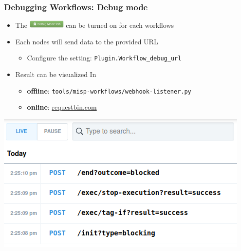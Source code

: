 \begin{frame}
    \frametitle{Debugging Workflows: Debug mode}
    \begin{itemize}
        \item The \includegraphics[width=70px]{pictures/debug-mode.png} can be turned on for each workflows
        \item Each nodes will send data to the provided URL
        \begin{itemize}
            \item Configure the setting: \texttt{Plugin.Workflow\_debug\_url}
        \end{itemize}
        \item Result can be visualized In
        \begin{itemize}
            \item \textbf{offline}: \texttt{tools/misp-workflows/webhook-listener.py}
            \item \textbf{online}: \url{requestbin.com}
        \end{itemize}
    \end{itemize}
    \begin{center}
        \includegraphics[width=0.6\linewidth]{pictures/request-bin.png}
    \end{center}
\end{frame}

